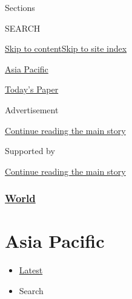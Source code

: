Sections

SEARCH

\protect\hyperlink{site-content}{Skip to
content}\protect\hyperlink{site-index}{Skip to site index}

\href{https://www.nytimes3xbfgragh.onion/section/world/asia}{Asia
Pacific}

\href{https://myaccount.nytimes3xbfgragh.onion/auth/login?response_type=cookie\&client_id=vi}{}

\href{https://www.nytimes3xbfgragh.onion/section/todayspaper}{Today's
Paper}

Advertisement

\protect\hyperlink{after-top}{Continue reading the main story}

Supported by

\protect\hyperlink{after-sponsor}{Continue reading the main story}

\hypertarget{world}{%
\subsubsection{\texorpdfstring{\href{/section/world}{World}}{World}}\label{world}}

\hypertarget{asia-pacific}{%
\section{Asia Pacific}\label{asia-pacific}}

\begin{itemize}
\tightlist
\item
  \protect\hyperlink{stream-panel}{Latest}
\item
  Search
\end{itemize}

